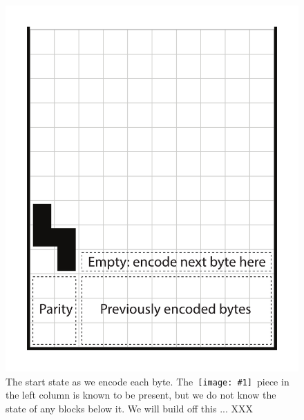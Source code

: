 \documentclass[twocolumn]{article}
\newcommand\tetrispiece[1]{\,\texttt{[image: \#1]}\hspace{0.1em}}
\newcommand\svert{\tetrispiece{s_vert}}
\begin{document}
\begin{figure}
  \centering
  \includegraphics[width=0.6 \linewidth]{encodingscheme}
  \caption{
    The start state as we encode each byte. The \svert\ piece in the
    left column is known to be present, but we do not know the state
    of any blocks below it. We will build off this ... XXX
    } \label{fig:encodingscheme}
\end{figure}
\end{document}
